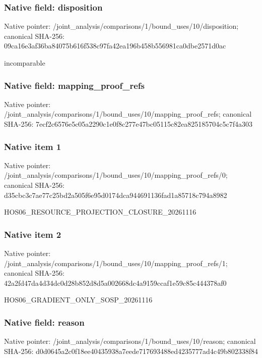 \documentclass[10pt,a4paper]{article}
\begin{document}
\subsubsection{Native field: disposition}
Native pointer: /joint\_\allowbreak{}analysis/comparisons/1/bound\_\allowbreak{}uses/10/disposition; canonical SHA-256: 09ca16e3af36ba84075b616f538c97fa42ea196b458b556981ca0dbe2571d0ac

\begingroup\raggedright\sloppy incomparable\par\endgroup

\subsubsection{Native field: mapping\_\allowbreak{}proof\_\allowbreak{}refs}
Native pointer: /joint\_\allowbreak{}analysis/comparisons/1/bound\_\allowbreak{}uses/10/mapping\_\allowbreak{}proof\_\allowbreak{}refs; canonical SHA-256: 7ecf2c6576e5c05a2290c1e0f8c277e47bc05115c82ea825185704c5c7f4a303

\subsubsection{Native item 1}
Native pointer: /joint\_\allowbreak{}analysis/comparisons/1/bound\_\allowbreak{}uses/10/mapping\_\allowbreak{}proof\_\allowbreak{}refs/0; canonical SHA-256: d35cbc3c7ae77c25bd2a505f6e95d0174dca944691136fad1a85718c794a8982

\begingroup\raggedright\sloppy HOS06\_\allowbreak{}RESOURCE\_\allowbreak{}PROJECTION\_\allowbreak{}CLOSURE\_\allowbreak{}20261116\par\endgroup

\subsubsection{Native item 2}
Native pointer: /joint\_\allowbreak{}analysis/comparisons/1/bound\_\allowbreak{}uses/10/mapping\_\allowbreak{}proof\_\allowbreak{}refs/1; canonical SHA-256: 42a2fd47da4d34dc0d28b852d8d5a002668dc4a9159ccaf1e59c85c444378af0

\begingroup\raggedright\sloppy HOS06\_\allowbreak{}GRADIENT\_\allowbreak{}ONLY\_\allowbreak{}SOSP\_\allowbreak{}20261116\par\endgroup

\subsubsection{Native field: reason}
Native pointer: /joint\_\allowbreak{}analysis/comparisons/1/bound\_\allowbreak{}uses/10/reason; canonical SHA-256: d0d0645a2c0f18ee40435938a7eede717693488ed4235777ad4c49b802338f84
\end{document}
